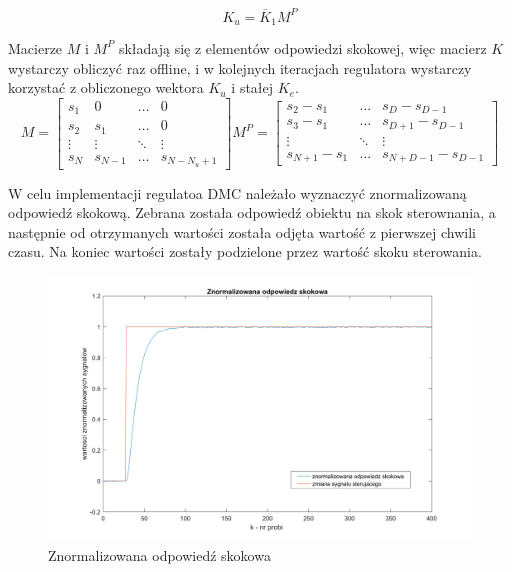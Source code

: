 \documentclass[a4paper, 10pt]{article}
\begin{document}
\[ K_u = \overline{K}_1 M^{P} \]

Macierze $M$ i $M^{P}$ składają się z elementów odpowiedzi skokowej, więc macierz $K$ wystarczy obliczyć raz offline, i w kolejnych iteracjach regulatora wystarczy korzystać z obliczonego wektora $K_{u}$ i stałej $K_{e}$.
\[M = 
\begin{bmatrix}
s_{1} & 0 & \dots & 0 \\
s_{2} & s_{1}  & \dots & 0 \\
\vdots  & \vdots &\ddots  &\vdots \\
s_{N}   & s_{N-1} &\dots  & s_{N-N_{u}+1}
\end{bmatrix} 
M^{P} = 
\begin{bmatrix}
s_{2}-s_{1} &  \dots & s_{D}-s_{D-1} \\
s_{3}-s_{1} &\dots & s_{D+1}-s_{D-1} \\
\vdots &\ddots &\vdots \\
s_{N+1}-s_{1}   &\dots  & s_{N+D-1}-s_{D-1}
\end{bmatrix} 	
\]	


W celu implementacji regulatoa DMC należało wyznaczyć znormalizowaną odpowiedź skokową. Zebrana została odpowiedź obiektu na skok sterownania, a następnie od otrzymanych wartości została odjęta wartość z pierwszej chwili czasu. Na koniec wartości zostały podzielone przez wartość skoku sterowania. 

\begin{figure}[H]
	\centering
	\includegraphics[width=0.9\linewidth]{odp_skok_wykre}
	\caption{Znormalizowana odpowiedź skokowa}
	\label{fig:odp_skok_wykre}
\end{figure}
\end{document}
